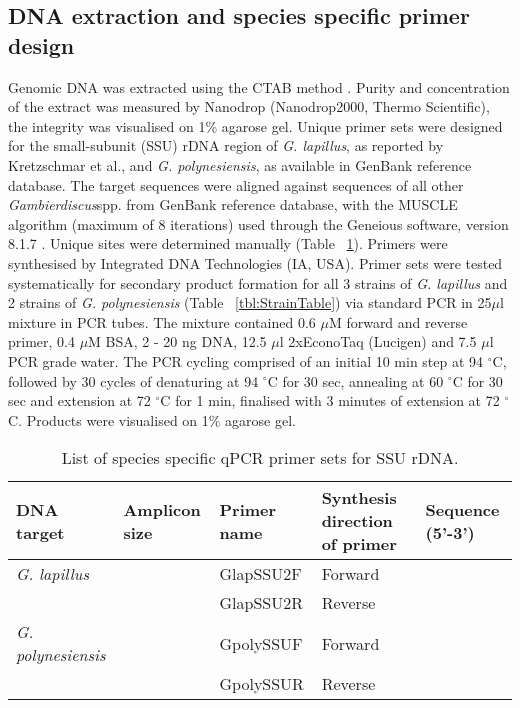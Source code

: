 \documentclass[12pt]{article}
\begin{document}
\subsection{DNA extraction and species specific primer design}
Genomic DNA was extracted using the CTAB method \citep{zhou1999analysis}. Purity and concentration of the extract was measured by Nanodrop (Nanodrop2000, Thermo Scientific), the integrity was visualised on 1\% agarose gel.
Unique primer sets were designed for the small-subunit (SSU) rDNA region of  \emph{G. lapillus}, as reported by Kretzschmar et al., and \emph{G. polynesiensis}, as available in GenBank reference database. The target sequences were aligned against sequences of all other \emph{Gambierdiscus}spp. from GenBank reference database, with the MUSCLE algorithm (maximum of 8 iterations) \citep{edgar2004muscle} used through the Geneious software, version 8.1.7 \citep{kearse2012geneious}. Unique sites were determined manually (Table ~\ref{tbl:PrimerTable}). Primers were synthesised by Integrated DNA Technologies (IA, USA).
Primer sets were tested systematically for secondary product formation for all 3 strains of \emph{G. lapillus} and 2 strains of \emph{G. polynesiensis} (Table ~\ref{tbl:StrainTable}) via standard PCR in 25$\mu$l mixture in PCR tubes. The mixture contained 0.6 $\mu$M forward and reverse primer, 0.4 $\mu$M BSA, 2 - 20 ng DNA, 12.5 $\mu$l 2xEconoTaq (Lucigen) and 7.5 $\mu$l PCR grade water.
The PCR cycling comprised of an initial 10 min step at 94 $^{\circ}$C, followed by 30 cycles of denaturing at 94 $^{\circ}$C for 30 sec, annealing at 60 $^{\circ}$C for 30 sec and extension at 72 $^{\circ}$C for 1 min, finalised with 3 minutes of extension at 72 $^{\circ}$C. Products were visualised on 1\% agarose gel.
\FloatBarrier
\begin{table}
\caption{List of species specific  qPCR primer sets for SSU rDNA.}
\label{tbl:PrimerTable}
\begin{tabular}{  | p{2cm} | p{2cm} | p{2cm} | p{2cm} | p{7cm} | }
\hline
\textbf{DNA target} & \textbf{Amplicon size} & \textbf{Primer name} & \textbf{Synthesis direction of primer} & \textbf{Sequence (5'-3')}  \\
  \hline
   \emph{G. lapillus}   & &GlapSSU2F & Forward & \\
   \hline
 & &GlapSSU2R & Reverse & \\
 \hline
\emph{G. polynesiensis}& &GpolySSUF& Forward & \\
 \hline
  & &GpolySSUR & Reverse &   \\
    \hline
 \end{tabular}
\end{table}
\end{document}
